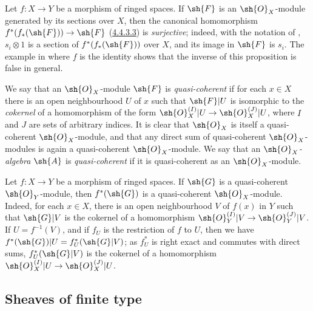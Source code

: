 \begin{env}[5.1.2]
\label{0.5.1.2}
Let $f:X\to Y$ be a morphism of ringed spaces.
If $\sh{F}$ is an $\sh{O}_X$-module generated by its sections over $X$, then the canonical homomorphism $f^*(f_*(\sh{F}))\to\sh{F}$ (\hyperref[0.4.4.3.3]{4.4.3.3}) is \emph{surjective};
indeed, with the notation of , $s_i\otimes 1$ is a section of $f^*(f_*(\sh{F}))$ over $X$, and its image in $\sh{F}$ is $s_i$.
The example in  where $f$ is the identity shows that the inverse of this proposition is false in general.

\end{env}

\begin{env}[5.1.3]
\label{0.5.1.3}
We say that an $\sh{O}_X$-module $\sh{F}$ is \emph{quasi-coherent} if for each $x\in X$ there is an open neighbourhood $U$ of $x$ such that $\sh{F}|U$ is isomorphic to the \emph{cokernel} of a homomorphism of the form $\sh{O}_X^{(I)}|U\to\sh{O}_X^{(J)}|U$, where $I$ and $J$ are sets of arbitrary indices.
It is clear that $\sh{O}_X$ is itself a quasi-coherent $\sh{O}_X$-module, and that any direct sum of quasi-coherent $\sh{O}_X$-modules is again a quasi-coherent $\sh{O}_X$-module.
We say that an \emph{$\sh{O}_X$-algebra $\sh{A}$} is \emph{quasi-coherent} if it is quasi-coherent as an $\sh{O}_X$-module.
\end{env}

\begin{env}[5.1.4]
\label{0.5.1.4}
Let $f:X\to Y$ be a morphism of ringed spaces.
If $\sh{G}$ is a quasi-coherent $\sh{O}_Y$-module, then $f^*(\sh{G})$ is a quasi-coherent $\sh{O}_X$-module.
Indeed, for each $x\in X$, there is an open neighbourhood $V$ of $f(x)$ in $Y$ such that $\sh{G}|V$ is the cokernel of a homomorphism $\sh{O}_Y^{(I)}|V\to\sh{O}_Y^{(J)}|V$.
If $U=f^{-1}(V)$, and if $f_U$ is the restriction of $f$ to $U$, then we have $f^*(\sh{G})|U=f_U^*(\sh{G}|V)$;
as $f_U^*$ is right exact and commutes with direct sums, $f_U^*(\sh{G}|V)$ is the cokernel of a homomorphism $\sh{O}_X^{(I)}|U\to\sh{O}_X^{(J)}|U$.
\end{env}

\subsection{Sheaves of finite type}
\label{subsection:0.5.2}

